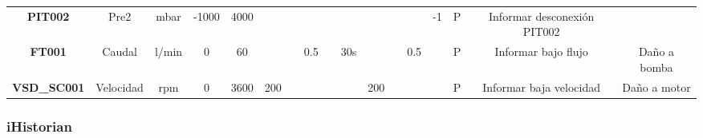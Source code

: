 \begin{table}
\begin{tabular}{ccccccccccccccccc}
		\textbf{PIT002}                           & Pre2                               & mbar                               & -1000                                      & 4000                                       &                                              &                                           &                                           &                                              &                                              &                                              &                                           &                                           & -1                                           & P                                          & Informar desconexión PIT002             &                                        \\
		\textbf{FT001}                            & Caudal                             & l/min                              & 0                                          & 60                                         &                                              &                                           & 0.5                                       &                                              & 30s                                          &                                              &                                           & 0.5                                       &                                              & P                                          & Informar bajo flujo                     & Daño a bomba                           \\
		\textbf{VSD\_SC001}                       & Velocidad                          & rpm                                & 0                                          & 3600                                       & 200                                          &                                           &                                           &                                              &                                              & 200                                          &                                           &                                           &                                              & P                                          & Informar baja velocidad                 & Daño a motor                          
	\end{tabular}
\end{table}

\subsubsection{iHistorian}


